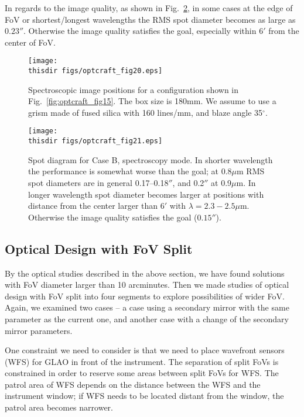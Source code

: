In regards to the image quality, as shown in
Fig.~\ref{fig:optcraft_fig21}, in some cases at the edge of FoV or
shortest/longest wavelengths the RMS spot diameter becomes as large as 
$0.23''$. Otherwise the image quality satisfies the goal, especially
within $6'$ from the center of FoV.

\begin{figure}[!ht]
\centerline{
\texttt{[image: \\thisdir figs/optcraft\_fig20.eps]}
}
\caption{
Spectroscopic image positions for a configuration shown in
 Fig.~\ref{fig:optcraft_fig15}. The box size is 180mm. We assume to use
 a grism made of fused silica with 160 lines/mm, and blaze angle
 35$^\circ$.
}
\label{fig:optcraft_fig20}
\end{figure}

\begin{figure}[!ht]
\centerline{
\texttt{[image: \\thisdir figs/optcraft\_fig21.eps]}
}
\caption{Spot diagram for Case B, spectroscopy mode.
In shorter wavelength the performance is somewhat worse than the goal;
 at 0.8$\mu$m RMS spot diameters are in general 0.17--0.18$''$, and 
 0.2$''$ at 0.9$\mu$m. In longer wavelength spot diameter becomes larger
 at positions with distance from the center larger than $6'$ with
 $\lambda = 2.3-2.5\mu$m. Otherwise the image quality satisfies the goal
 ($0.15''$).
}
\label{fig:optcraft_fig21}
\end{figure}


\clearpage

\subsection{Optical Design with FoV Split}

By the optical studies described in the above section, we have found
solutions with FoV diameter larger than 10 arcminutes. Then we made
studies of optical design with FoV split into four segments to explore
possibilities of wider FoV. Again, we examined two cases -- a case using 
a secondary mirror with the same parameter as the current one, and
another case with a change of the secondary mirror parameters.

One constraint we need to consider is that we need to place wavefront
sensors (WFS) for GLAO in front of the instrument. The separation of
split FoVs is constrained in order to reserve some areas between split
FoVs for WFS. The patrol area of WFS depends on the distance between the
WFS and the instrument window; if WFS needs to be located distant from
the window, the patrol area becomes narrower.

